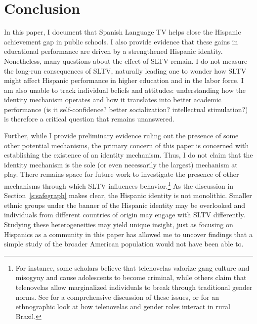 \documentclass[11pt]{article}
\begin{document}

\section{Conclusion} \label{s:conclusion}

In this paper, I document that Spanish Language TV helps close the Hispanic achievement gap in public schools. I also provide evidence that these gains in educational performance are driven by a strengthened Hispanic identity. Nonetheless, many questions about the effect of SLTV remain. I do not measure the long-run consequences of SLTV, naturally leading one to wonder how SLTV might affect Hispanic performance in higher education and in the labor force. I am also unable to track individual beliefs and attitudes: understanding how the identity mechanism operates and how it translates into better academic performance (is it self-confidence? better socialization? intellectual stimulation?) is therefore a critical question that remains unanswered.

Further, while I provide preliminary evidence ruling out the presence of some other potential mechanisms, the primary concern of this paper is concerned with establishing the existence of an identity mechanism. Thus, I do not claim that the identity mechanism is the sole (or even necessarily the largest) mechanism at play. There remains space for future work to investigate the presence of other mechanisms through which SLTV influences behavior.\footnote{ For instance, some scholars believe that telenovelas valorize gang culture and misogyny and cause adolescents to become criminal, while others claim that telenovelas allow marginalized individuals to break through traditional gender norms. See \cite{benavides2009drugs} for a comprehensive discussion of these issues, or \cite{la2004telenovela} for an ethnographic look at how telenovelas and gender roles interact in rural Brazil.} As the discussion in Section~\ref{s:safegraph} makes clear, the Hispanic identity is not monolithic. Smaller ethnic groups under the banner of the Hispanic identity may be overlooked and individuals from different countries of origin may engage with SLTV differently. Studying these heterogeneities may yield unique insight, just as focusing on Hispanics as a community in this paper has allowed me to uncover findings that a simple study of the broader American population would not have been able to. 
\end{document}
